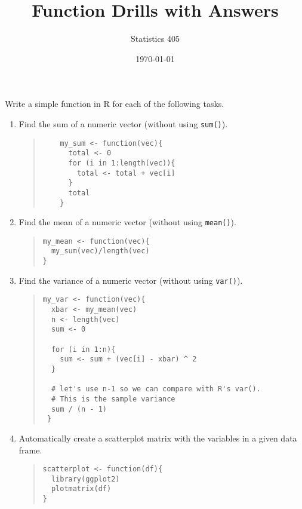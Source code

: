 \documentclass{article}
\begin{document}
\title{Function Drills with Answers}
\author{Statistics 405}
\date{\today}
\maketitle


\noindent Write a simple function in R for each of the following tasks. 
\begin{enumerate}
\item Find the sum of a numeric vector (without using \verb!sum()!).
  \begin{quote}
     \begin{verbatim}
	my_sum <- function(vec){
	  total <- 0
	  for (i in 1:length(vec)){
	  	total <- total + vec[i]
	  }
	  total
	}
    \end{verbatim}
  \end{quote}

\item Find the mean of a numeric vector (without using \verb!mean()!).
  \begin{quote}
    \begin{verbatim}
my_mean <- function(vec){
  my_sum(vec)/length(vec)
}
    \end{verbatim}
  \end{quote}

\item Find the variance of a numeric vector (without using \verb!var()!).
  \begin{quote}
    \begin{verbatim}
my_var <- function(vec){
  xbar <- my_mean(vec)
  n <- length(vec)
  sum <- 0
  
  for (i in 1:n){
  	sum <- sum + (vec[i] - xbar) ^ 2
  }
  
  # let's use n-1 so we can compare with R's var(). 
  # This is the sample variance
  sum / (n - 1)
 }	

    \end{verbatim}
  \end{quote}

\item Automatically create a scatterplot matrix with the variables in a given data frame.
  \begin{quote}
    \begin{verbatim}
scatterplot <- function(df){
  library(ggplot2)
  plotmatrix(df)
}
    \end{verbatim}
  \end{quote}


\end{enumerate}
\end{document}
